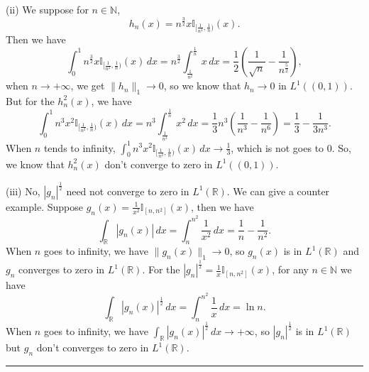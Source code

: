 \documentclass[12pt,a4paper]{ctexart}
\begin{document}
(ii) We suppose for $n \in \mathbb{N}$,
\begin{equation*}
   h_{n} (x) = n^{\frac{3}{2}} x \mathbb{I}_{[\frac{1}{n^{2}}, \frac{1}{n})} (x).
\end{equation*}
Then we have
\begin{equation*}
   \int_{0}^{1} n^{\frac{3}{2}} x \mathbb{I}_{[\frac{1}{n^{2}}, \frac{1}{n})} (x) \, d x  = n^{\frac{3}{2}} \int_{\frac{1}{n^{2}}}^{\frac{1}{n}} x \, d x  = \frac{1}{2} (\frac{1}{\sqrt{n}} - \frac{1}{n^{\frac{5}{2}}}),
\end{equation*}
when $n \to + \infty$, we get $\|h_{n} \|_{1} \to 0$, so we know that $h_{n} \to 0$ in $L^{1}((0, 1))$. But for the $h_{n}^{2}(x)$, we have
\begin{equation*}
   \int_{0}^{1} n^{3} x^{2} \mathbb{I}_{[\frac{1}{n^{2}}, \frac{1}{n})} (x) \, d x  = n^{3} \int_{\frac{1}{n^{2}}}^{\frac{1}{n}} x^{2} \, d x  = \frac{1}{3} n^{3} (\frac{1}{n^{3}} - \frac{1}{n^{6}}) = \frac{1}{3} - \frac{1}{3 n^{3}}.
\end{equation*}
When $n$ tends to infinity, $\int_{0}^{1} n^{3} x^{2} \mathbb{I}_{[\frac{1}{n^{2}}, \frac{1}{n})} (x) \, d x \rightarrow \frac{1}{3}$, which is not goes to $0$. So, we know that $h_{n}^{2}(x)$ don't converge to zero in $L^{1}((0, 1))$. 

(iii) No, $|g_{n}|^{\frac{1}{2}}$ need not converge to zero in $L^{1}(\mathbb{R})$. We can give a counter example. Suppose $g_{n}(x) = \frac{1}{x^{2}} \mathbb{I}_{[n, n^{2}]} (x)$, then we have
\begin{equation*}
   \int_{\mathbb{R}}^{} |g_{n}(x)| \, d x  = \int_{n}^{n^{2}} \frac{1}{x^{2}} \, d x  = \frac{1}{n} - \frac{1}{n^{2}}.
\end{equation*}
When $n$ goes to infinity, we have $\|g_{n}(x) \|_{1} \to 0$, so $g_{n} (x)$ is in $L^{1}(\mathbb{R})$ and $g_{n}$ converges to zero in $L^{1}(\mathbb{R})$. For the $|g_{n}|^{\frac{1}{2}} = \frac{1}{x} \mathbb{I}_{[n, n^{2}]} (x)$, for any $n \in \mathbb{N}$ we have 
\begin{equation*}
   \int_{\mathbb{R}}^{} |g_{n}(x)|^{\frac{1}{2}} \, d x  = \int_{n}^{n^{2}} \frac{1}{x} \, d x  = \ln n.
\end{equation*}
When $n$ goes to infinity, we have $\int_{\mathbb{R}}^{} |g_{n}(x)|^{\frac{1}{2}} \, d x \to + \infty$, so $|g_{n}|^{\frac{1}{2}}$ is in $L^{1}(\mathbb{R})$ but $g_{n}$ don't converges to zero in $L^{1}(\mathbb{R})$.
 



\noindent\rule[0.25\baselineskip]{\textwidth}{0.5pt}
\end{document}
